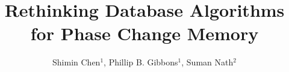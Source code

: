 \documentclass[t]{beamer}
\title[July Presentation 2011\hspace{14em}\insertframenumber/\inserttotalframenumber]{Rethinking Database Algorithms\\ for Phase Change Memory}
\author[Jeppe R. Thomsen]{Shimin Chen$^{1}$, Phillip B. Gibbons$^{1}$, Suman Nath$^{2}$}%
\institute{$^{1}$Intel Labs Pittsburgh, $^{2}$Microsoft Research}
\begin{document}
\begin{frame} %
\titlepage
\end{frame}
%
%
%







\end{document}
